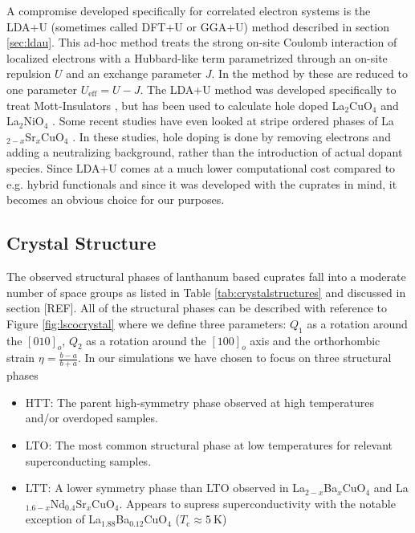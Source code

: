 A compromise developed specifically for correlated electron systems is the LDA+U (sometimes called DFT+U or GGA+U) method \cite{Anisimov1997} described in section \ref{sec:ldau}. This ad-hoc method treats the strong on-site Coulomb interaction of localized electrons with a Hubbard-like term parametrized through an on-site repulsion $U$ and an exchange parameter $J$. In the method by \citeauthor{Dudarev1998} \cite{Dudarev1998} these are reduced to one parameter $U_\text{eff} = U - J$. The LDA+U method was developed specifically to treat Mott-Insulators \cite{Anisimov1997}, but has been used to calculate hole doped La$_2$CuO$_4$ and La$_2$NiO$_4$ \cite{Anisimov1997}. Some recent studies have even looked at stripe ordered phases of La$_{2-x}$Sr$_x$CuO$_4$ \cite{Anisimov2004, Pesant2011}. In these studies, hole doping is done by removing electrons and adding a neutralizing background, rather than the introduction of actual dopant species. Since LDA+U comes at a much lower computational cost compared to e.g. hybrid functionals and since it was developed with the cuprates in mind, it becomes an obvious choice for our purposes.

\subsection{Crystal Structure}
The observed structural phases of lanthanum based cuprates fall into a moderate number of space groups as listed in Table \ref{tab:crystalstructures} and discussed in section [REF]. All of the structural phases can be described with reference to Figure \ref{fig:lscocrystal} where we define three parameters: $Q_1$ as a rotation around the $[010]_o$, $Q_2$ as a rotation around the $[100]_o$ axis and the orthorhombic strain $\eta=\frac{b-a}{b+a}$. In our simulations we have chosen to focus on three structural phases

\begin{itemize}
	\item HTT: The parent high-symmetry phase observed at high temperatures and/or overdoped samples.
	\item LTO: The most common structural phase at low temperatures for relevant superconducting samples.
	\item LTT: A lower symmetry phase than LTO observed in La$_{2-x}$Ba$_x$CuO$_4$ and La$_{1.6-x}$Nd$_{0.4}$Sr$_x$CuO$_4$. Appears to supress superconductivity with the notable exception of La$_{1.88}$Ba$_{0.12}$CuO$_4$ ($T_\text{c} \approx \SI{5}{\kelvin}$)
\end{itemize}

